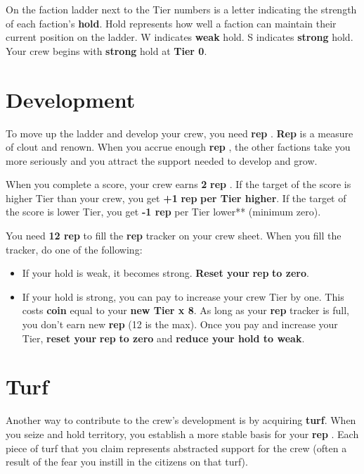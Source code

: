 \documentclass[11pt,fleqn,a5paper]{book}
\newcommand{\gameterm}[1]{\textbf{#1}}
\begin{document}
On the faction ladder next to the Tier numbers is a letter indicating the strength of each faction’s \textbf{hold}. Hold represents how well a faction can maintain their current position on the ladder. W indicates \textbf{weak} hold. S indicates \textbf{strong} hold. Your crew begins with \textbf{strong} hold at \textbf{Tier 0}.

\section{Development}

To move up the ladder and develop your crew, you need \gameterm{rep} . \gameterm{Rep}  is a measure of clout and renown. When you accrue enough \gameterm{rep} , the other factions take you more seriously and you attract the support needed to develop and grow.

When you complete a score, your crew earns \textbf{2 }\gameterm{rep} . If the target of the score is higher Tier than your crew, you get \textbf{+1 }\gameterm{rep} \textbf{ per Tier higher}. If the target of the score is lower Tier, you get \textbf{-1 \gameterm{rep} } per Tier lower** (minimum zero).

You need \textbf{12 \gameterm{rep} } to fill the \gameterm{rep}  tracker on your crew sheet. When you fill the tracker, do one of the following:

\begin{itemize}
	\item If your hold is weak, it becomes strong. \textbf{Reset your }\gameterm{rep} \textbf{ to zero}.
	\item If your hold is strong, you can pay to increase your crew Tier by one. This costs \gameterm{coin}  equal to your \textbf{new Tier x 8}. As long as your \gameterm{rep}  tracker is full, you don’t earn new \gameterm{rep}  (12 is the max). Once you pay and increase your Tier, \textbf{reset your }\gameterm{rep} \textbf{ to zero} and \textbf{reduce your hold to weak}.
\end{itemize}

\section{Turf}

Another way to contribute to the crew’s development is by acquiring \textbf{turf}. When you seize and hold territory, you establish a more stable basis for your \gameterm{rep} . Each piece of turf that you claim represents abstracted support for the crew (often a result of the fear you instill in the citizens on that turf).
\end{document}
